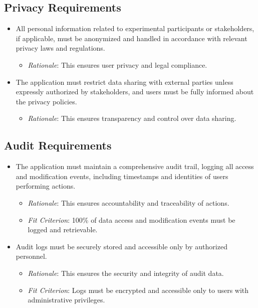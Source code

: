 \documentclass[12pt]{article}
\begin{document}
\subsection{Privacy Requirements}
\begin{itemize}
    \item All personal information related to experimental participants or
    stakeholders, if applicable, must be anonymized and handled in accordance
    with relevant privacy laws and regulations.
    \begin{itemize}
        \item \textit{Rationale}: This ensures user privacy and legal
        compliance.
    \end{itemize}
    
    \item The application must restrict data sharing with external parties
    unless expressly authorized by stakeholders, and users must be fully
    informed about the privacy policies.
    \begin{itemize}
        \item \textit{Rationale}: This ensures transparency and control over
        data sharing.
    \end{itemize}
\end{itemize}

\subsection{Audit Requirements}
\begin{itemize}
    \item The application must maintain a comprehensive audit trail, logging all
    access and modification events, including timestamps and identities of users
    performing actions.
    \begin{itemize}
        \item \textit{Rationale}: This ensures accountability and traceability
        of actions.
        \item \textit{Fit Criterion}: 100\% of data access and modification
        events must be logged and retrievable.
    \end{itemize}
    
    \item Audit logs must be securely stored and accessible only by authorized
    personnel.
    \begin{itemize}
        \item \textit{Rationale}: This ensures the security and integrity of
        audit data.
        \item \textit{Fit Criterion}: Logs must be encrypted and accessible only
        to users with administrative privileges.
    \end{itemize}
\end{itemize}
\end{document}

